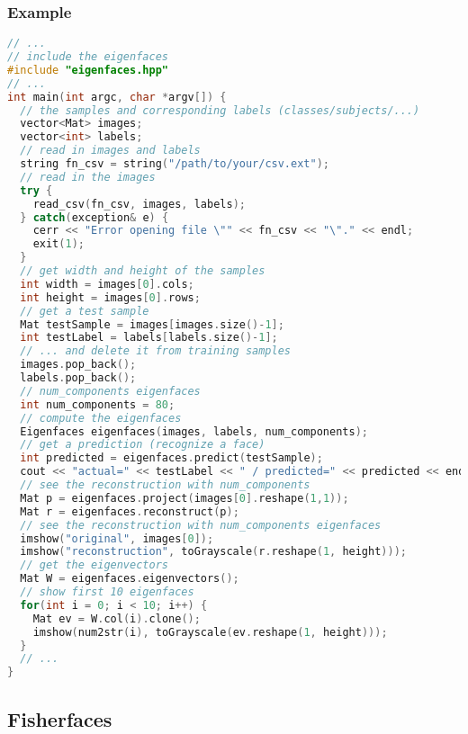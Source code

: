 \subsubsection{Example}
\begin{lstlisting}[language=c++]
// ...
// include the eigenfaces
#include "eigenfaces.hpp"
// ...
int main(int argc, char *argv[]) {
  // the samples and corresponding labels (classes/subjects/...)
  vector<Mat> images;
  vector<int> labels;
  // read in images and labels
  string fn_csv = string("/path/to/your/csv.ext");
  // read in the images
  try {
    read_csv(fn_csv, images, labels);
  } catch(exception& e) {
    cerr << "Error opening file \"" << fn_csv << "\"." << endl;
    exit(1);
  }
  // get width and height of the samples
  int width = images[0].cols;
  int height = images[0].rows;
  // get a test sample
  Mat testSample = images[images.size()-1];
  int testLabel = labels[labels.size()-1];
  // ... and delete it from training samples
  images.pop_back();
  labels.pop_back();
  // num_components eigenfaces 
  int num_components = 80;
  // compute the eigenfaces
  Eigenfaces eigenfaces(images, labels, num_components);
  // get a prediction (recognize a face)
  int predicted = eigenfaces.predict(testSample);
  cout << "actual=" << testLabel << " / predicted=" << predicted << endl;
  // see the reconstruction with num_components
  Mat p = eigenfaces.project(images[0].reshape(1,1));
  Mat r = eigenfaces.reconstruct(p);
  // see the reconstruction with num_components eigenfaces
  imshow("original", images[0]);
  imshow("reconstruction", toGrayscale(r.reshape(1, height)));
  // get the eigenvectors
  Mat W = eigenfaces.eigenvectors();
  // show first 10 eigenfaces
  for(int i = 0; i < 10; i++) {
    Mat ev = W.col(i).clone();
    imshow(num2str(i), toGrayscale(ev.reshape(1, height)));
  }
  // ...
}
\end{lstlisting}

\subsection{Fisherfaces}

